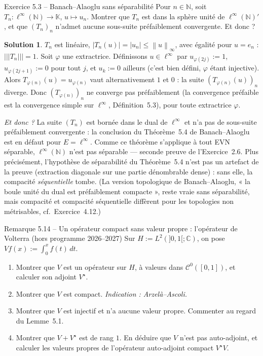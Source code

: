 \documentclass[11pt,a4paper]{article}
\newcommand{\N}{\mathbb{N}}
\newcommand{\C}{\mathbb{C}}
\newcommand{\K}{\mathbb{K}}
\newcommand{\norm}[1]{\left\|#1\right\|}
\newcommand{\opnorm}[1]{|\!|\!|#1|\!|\!|}
\newcommand{\Cz}{\mathcal{C}^0}
\theoremstyle{definition}
\newtheorem*{solution}{Solution}
\begin{document}
\begin{exo}{Exercice 5.3 -- Banach--Alaoglu sans séparabilité}
Pour $n\in\N$, soit $T_n:\ell^\infty(\N)\to\K$, $u\mapsto u_n$. Montrer que $T_n$ est dans la sphère unité de $\ell^\infty(\N)'$, et que $(T_n)_n$ n'admet aucune sous-suite préfaiblement convergente. Et donc ?
\end{exo}

\begin{solution}
$T_n$ est linéaire, $|T_n(u)|=|u_n|\le\norm u_\infty$, avec égalité pour $u=e_n$ : $\opnorm{T_n}=1$. Soit $\varphi$ une extractrice. Définissons $u\in\ell^\infty$ par $u_{\varphi(2j)}:=1$, $u_{\varphi(2j+1)}:=0$ pour tout $j$, et $u_k:=0$ ailleurs (c'est bien défini, $\varphi$ étant injective). Alors $T_{\varphi(n)}(u)=u_{\varphi(n)}$ vaut alternativement $1$ et $0$ : la suite $(T_{\varphi(n)}(u))_n$ diverge. Donc $(T_{\varphi(n)})_n$ ne converge pas préfaiblement (la convergence préfaible est la convergence simple sur $\ell^\infty$, Définition~5.3), pour toute extractrice $\varphi$.

\emph{Et donc ?} La suite $(T_n)$ est bornée dans le dual de $\ell^\infty$ et n'a pas de sous-suite préfaiblement convergente : la conclusion du Théorème~5.4 de Banach--Alaoglu est en défaut pour $E=\ell^\infty$. Comme ce théorème s'applique à tout EVN séparable, $\ell^\infty(\N)$ n'est pas séparable — seconde preuve de l'Exercice~2.6. Plus précisément, l'hypothèse de séparabilité du Théorème~5.4 n'est pas un artefact de la preuve (extraction diagonale sur une partie dénombrable dense) : sans elle, la compacité \emph{séquentielle} tombe. (La version topologique de Banach--Alaoglu, « la boule unité du dual est préfaiblement compacte », reste vraie sans séparabilité, mais compacité et compacité séquentielle diffèrent pour les topologies non métrisables, cf.\ Exercice~4.12.)
\end{solution}

\begin{exo}{Remarque 5.14 -- Un opérateur compact sans valeur propre : l'opérateur de Volterra (hors programme 2026--2027)}
Sur $H:=L^2(]0,1[;\C)$, on pose $Vf(x):=\int_0^xf(t)\,dt$.
\begin{enumerate}[label=(\alph*)]
  \item Montrer que $V$ est un opérateur sur $H$, à valeurs dans $\Cz([0,1])$, et calculer son adjoint $V^\star$.
  \item Montrer que $V$ est compact. \emph{Indication : Arzelà--Ascoli.}
  \item Montrer que $V$ est injectif et n'a aucune valeur propre. Commenter au regard du Lemme~5.1.
  \item Montrer que $V+V^\star$ est de rang $1$. En déduire que $V$ n'est pas auto-adjoint, et calculer les valeurs propres de l'opérateur auto-adjoint compact $V^\star V$.
\end{enumerate}
\end{exo}
\end{document}
